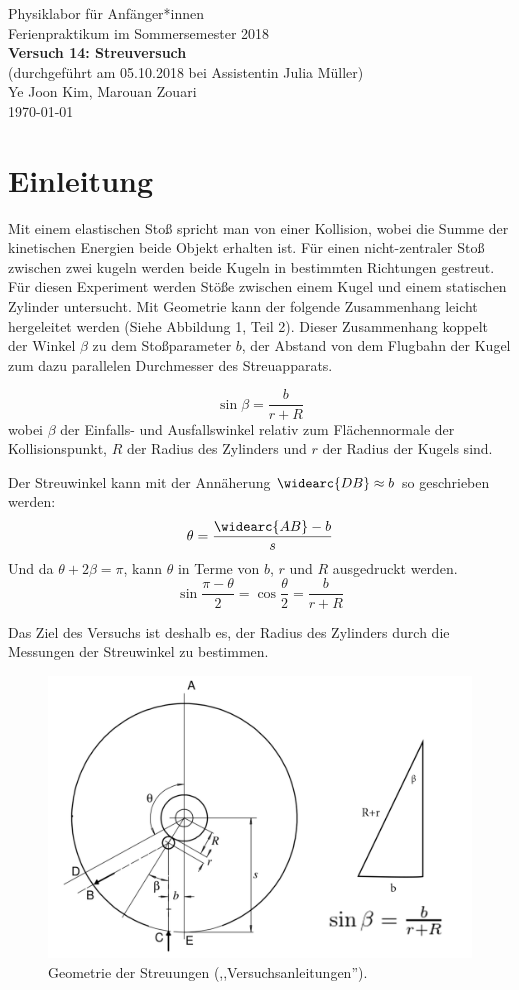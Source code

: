 \documentclass[11pt,a4paper]{article}
\begin{document}
	

{
	\centering 
	\large 
	Physiklabor für Anfänger*innen \\
	Ferienpraktikum im Sommersemester 2018 \\[4mm]
	\textbf{\LARGE 
		Versuch 14: Streuversuch
	} \\[3mm]
	(durchgeführt am 05.10.2018 bei Assistentin Julia Müller) \\
	Ye Joon Kim, Marouan Zouari\\
	\today \\[10mm]
}

\tableofcontents
\newpage
\section{Einleitung}
Mit einem elastischen Stoß spricht man von einer Kollision, wobei die Summe der kinetischen Energien beide Objekt erhalten ist. Für einen nicht-zentraler Stoß zwischen zwei kugeln werden beide Kugeln in bestimmten Richtungen gestreut. Für diesen Experiment werden Stöße zwischen einem Kugel und einem statischen Zylinder untersucht. Mit Geometrie kann  der folgende Zusammenhang leicht hergeleitet werden (Siehe Abbildung 1, Teil 2). Dieser Zusammenhang koppelt der Winkel $\beta$ zu dem Stoßparameter $b$, der Abstand von dem Flugbahn der Kugel zum dazu parallelen Durchmesser des Streuapparats. 

$$\sin\beta = \frac{b}{r+R}$$
wobei $\beta$ der Einfalls- und Ausfallswinkel relativ zum Flächennormale der Kollisionspunkt, $R$ der Radius des Zylinders und $r$ der Radius der Kugels sind. 

Der Streuwinkel kann mit der Annäherung $\widearc{DB}\approx b$ so geschrieben werden:
$$\theta = \frac{\widearc{AB}-b}{s}$$
Und da $\theta + 2\beta = \pi$, kann $\theta$ in Terme von $b$, $r$ und $R$ ausgedruckt werden. 
$$\sin{\frac{\pi-\theta}{2}}=\cos{\frac{\theta}{2}}=\frac{b}{r+R}$$

Das Ziel des Versuchs ist deshalb es, der Radius des Zylinders durch die Messungen der Streuwinkel zu bestimmen. 


\begin{figure}
	\centering
	\includegraphics[width=\linewidth]{Abb1}
	\caption{Geometrie der Streuungen (,,Versuchsanleitungen'').}
\end{figure}
\end{document}
